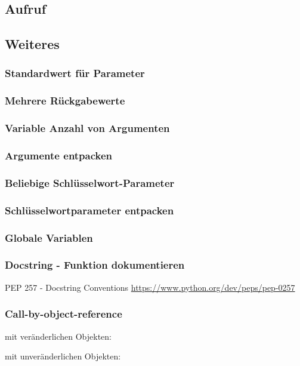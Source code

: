

\subsection{Aufruf}


\subsection{Weiteres}

\subsubsection{Standardwert für Parameter}


\subsubsection{Mehrere Rückgabewerte}


\subsubsection{Variable Anzahl von Argumenten}


\subsubsection{Argumente entpacken}


\subsubsection{Beliebige Schlüsselwort-Parameter}


\subsubsection{Schlüsselwortparameter entpacken}


\subsubsection{Globale Variablen}


\subsubsection{Docstring - Funktion dokumentieren}
PEP 257 - Docstring Conventions \url{https://www.python.org/dev/peps/pep-0257}


\subsubsection{Call-by-object-reference}
mit veränderlichen Objekten:

mit unveränderlichen Objekten:

